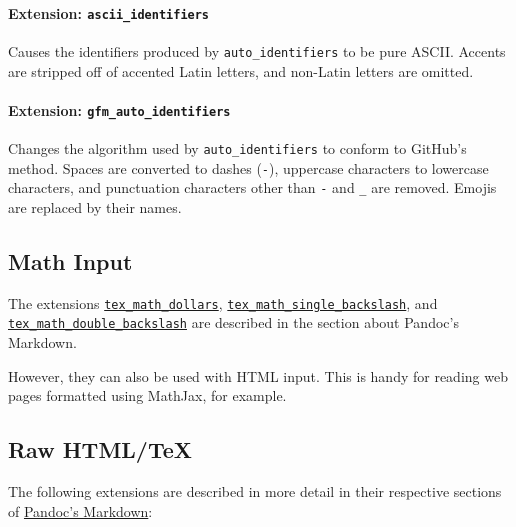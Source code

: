 \documentclass[
  a4paper,
]{article}
\begin{document}
\hypertarget{extension-ascii_identifiers}{%
\paragraph{\texorpdfstring{Extension:
\texttt{ascii\_identifiers}}{Extension: ascii\_identifiers}}\label{extension-ascii_identifiers}}

Causes the identifiers produced by \texttt{auto\_identifiers} to be pure
ASCII. Accents are stripped off of accented Latin letters, and non-Latin
letters are omitted.

\hypertarget{extension-gfm_auto_identifiers}{%
\paragraph{\texorpdfstring{Extension:
\texttt{gfm\_auto\_identifiers}}{Extension: gfm\_auto\_identifiers}}\label{extension-gfm_auto_identifiers}}

Changes the algorithm used by \texttt{auto\_identifiers} to conform to
GitHub's method. Spaces are converted to dashes (\texttt{-}), uppercase
characters to lowercase characters, and punctuation characters other
than \texttt{-} and \texttt{\_} are removed. Emojis are replaced by
their names.

\hypertarget{math-input}{%
\subsection{Math Input}\label{math-input}}

The extensions
\protect\hyperlink{extension-tex_math_dollars}{\texttt{tex\_math\_dollars}},
\protect\hyperlink{extension-tex_math_single_backslash}{\texttt{tex\_math\_single\_backslash}},
and
\protect\hyperlink{extension-tex_math_double_backslash}{\texttt{tex\_math\_double\_backslash}}
are described in the section about Pandoc's Markdown.

However, they can also be used with HTML input. This is handy for
reading web pages formatted using MathJax, for example.

\hypertarget{raw-htmltex}{%
\subsection{Raw HTML/TeX}\label{raw-htmltex}}

The following extensions are described in more detail in their
respective sections of \protect\hyperlink{pandocs-markdown}{Pandoc's
Markdown}:
\end{document}
